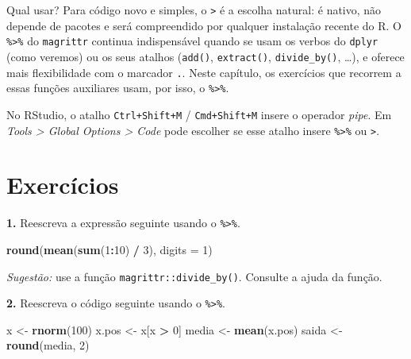 \documentclass[
  portuguese,
  11pt,
  openany]{book}
\newenvironment{Shaded}{\begin{snugshade}}{\end{snugshade}}
\newcommand{\AttributeTok}[1]{\textcolor[rgb]{0.13,0.29,0.53}{#1}}
\newcommand{\DecValTok}[1]{\textcolor[rgb]{0.00,0.00,0.81}{#1}}
\newcommand{\FunctionTok}[1]{\textcolor[rgb]{0.13,0.29,0.53}{\textbf{#1}}}
\newcommand{\NormalTok}[1]{#1}
\newcommand{\OtherTok}[1]{\textcolor[rgb]{0.56,0.35,0.01}{#1}}
\newcommand{\SpecialCharTok}[1]{\textcolor[rgb]{0.81,0.36,0.00}{\textbf{#1}}}
\begin{document}
Qual usar? Para código novo e simples, o \texttt{\textbar{}\textgreater{}} é a escolha natural: é nativo, não
depende de pacotes e será compreendido por qualquer instalação recente do R. O \texttt{\%\textgreater{}\%}
do \texttt{magrittr} continua indispensável quando se usam os verbos do \texttt{dplyr} (como
veremos) ou os seus atalhos (\texttt{add()}, \texttt{extract()}, \texttt{divide\_by()}, \ldots), e oferece mais
flexibilidade com o marcador \texttt{.}. Neste capítulo, os exercícios que recorrem a essas
funções auxiliares usam, por isso, o \texttt{\%\textgreater{}\%}.

No RStudio, o atalho \texttt{Ctrl+Shift+M} / \texttt{Cmd+Shift+M} insere o operador \emph{pipe}. Em
\emph{Tools \textgreater{} Global Options \textgreater{} Code} pode escolher se esse atalho insere \texttt{\%\textgreater{}\%} ou \texttt{\textbar{}\textgreater{}}.

\section{Exercícios}\label{exercuxedcios-10}

\textbf{1.} Reescreva a expressão seguinte usando o \texttt{\%\textgreater{}\%}.

\begin{Shaded}
\begin{Highlighting}[]
\FunctionTok{round}\NormalTok{(}\FunctionTok{mean}\NormalTok{(}\FunctionTok{sum}\NormalTok{(}\DecValTok{1}\SpecialCharTok{:}\DecValTok{10}\NormalTok{) }\SpecialCharTok{/} \DecValTok{3}\NormalTok{), }\AttributeTok{digits =} \DecValTok{1}\NormalTok{)}
\end{Highlighting}
\end{Shaded}

\emph{Sugestão:} use a função \texttt{magrittr::divide\_by()}. Consulte a ajuda da função.

\textbf{2.} Reescreva o código seguinte usando o \texttt{\%\textgreater{}\%}.

\begin{Shaded}
\begin{Highlighting}[]
\NormalTok{x }\OtherTok{\textless{}{-}} \FunctionTok{rnorm}\NormalTok{(}\DecValTok{100}\NormalTok{)}
\NormalTok{x.pos }\OtherTok{\textless{}{-}}\NormalTok{ x[x }\SpecialCharTok{\textgreater{}} \DecValTok{0}\NormalTok{]}
\NormalTok{media }\OtherTok{\textless{}{-}} \FunctionTok{mean}\NormalTok{(x.pos)}
\NormalTok{saida }\OtherTok{\textless{}{-}} \FunctionTok{round}\NormalTok{(media, }\DecValTok{2}\NormalTok{)}
\end{Highlighting}
\end{Shaded}
\end{document}
